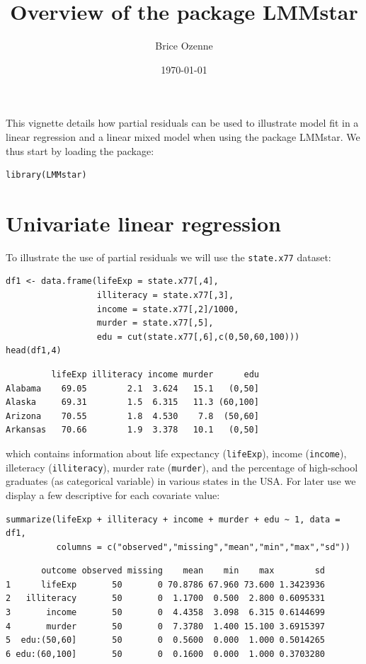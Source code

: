 \documentclass[12pt]{article}
\author{Brice Ozenne}
\date{\today}
\title{Overview of the package LMMstar}
\begin{document}
\maketitle
This vignette details how partial residuals can be used to illustrate
model fit in a linear regression and a linear mixed model when using
the package LMMstar. We thus start by loading the package:
\lstset{language=r,label= ,caption= ,captionpos=b,numbers=none}
\begin{lstlisting}
library(LMMstar)
\end{lstlisting}


\section{Univariate linear regression}
\label{sec:org57e6b9c}

To illustrate the use of partial residuals we will use the \texttt{state.x77}
dataset:
\lstset{language=r,label= ,caption= ,captionpos=b,numbers=none}
\begin{lstlisting}
df1 <- data.frame(lifeExp = state.x77[,4],
                  illiteracy = state.x77[,3],
                  income = state.x77[,2]/1000,
                  murder = state.x77[,5],
                  edu = cut(state.x77[,6],c(0,50,60,100)))
head(df1,4)
\end{lstlisting}

\begin{verbatim}
         lifeExp illiteracy income murder      edu
Alabama    69.05        2.1  3.624   15.1   (0,50]
Alaska     69.31        1.5  6.315   11.3 (60,100]
Arizona    70.55        1.8  4.530    7.8  (50,60]
Arkansas   70.66        1.9  3.378   10.1   (0,50]
\end{verbatim}


 which contains information about life expectancy (\texttt{lifeExp}), income
(\texttt{income}), illeteracy (\texttt{illiteracy}), murder rate (\texttt{murder}), and the
percentage of high-school graduates (as categorical variable) in
various states in the USA. For later use we display a few descriptive
for each covariate value:
\lstset{language=r,label= ,caption= ,captionpos=b,numbers=none}
\begin{lstlisting}
summarize(lifeExp + illiteracy + income + murder + edu ~ 1, data = df1,
          columns = c("observed","missing","mean","min","max","sd"))
\end{lstlisting}

\begin{verbatim}
       outcome observed missing    mean    min    max        sd
1      lifeExp       50       0 70.8786 67.960 73.600 1.3423936
2   illiteracy       50       0  1.1700  0.500  2.800 0.6095331
3       income       50       0  4.4358  3.098  6.315 0.6144699
4       murder       50       0  7.3780  1.400 15.100 3.6915397
5  edu:(50,60]       50       0  0.5600  0.000  1.000 0.5014265
6 edu:(60,100]       50       0  0.1600  0.000  1.000 0.3703280
\end{verbatim}
\end{document}
